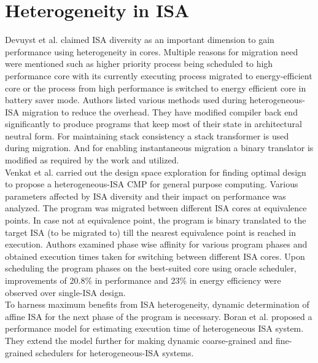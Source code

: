\documentclass[a4paper,12pt, final]{report}
\begin{document}
\section{Heterogeneity in ISA}
Devuyst et al. \cite{DeVuystVT12} claimed ISA diversity as an important dimension to gain performance using heterogeneity in cores. Multiple reasons for migration need were mentioned such as higher priority process being scheduled to high performance core with its currently executing process migrated to energy-efficient core or the process from high performance is switched to energy efficient core in battery saver mode. Authors listed various methods used during heterogeneous-ISA migration to reduce the overhead. They have modified compiler back end significantly to produce programs that keep most of their state in architectural neutral form. For maintaining stack consistency a stack transformer is used during migration. And for enabling instantaneous migration a binary translator is modified as required by the work and utilized. \\
\indent Venkat et al. \cite{venkat} carried out the design space exploration for finding optimal design to propose a heterogeneous-ISA CMP for general purpose computing.
Various parameters affected by ISA diversity and their impact on performance was analyzed. The program was migrated between different ISA cores at equivalence points. In case not at equivalence point, the program is binary translated to the target ISA (to be migrated to) till the nearest equivalence point is reached in execution. Authors examined phase wise affinity for various program phases and obtained execution times taken for switching between different ISA cores. Upon scheduling the program phases on the best-suited core using oracle scheduler, improvements of 20.8\% in performance and 23\% in energy efficiency were observed over single-ISA design. \\
\indent To harness maximum benefits from ISA heterogeneity, dynamic determination of affine ISA for the next phase of the program is necessary. Boran et al. \cite{perfcadsl} proposed a performance model for estimating execution time of heterogeneous ISA system. They extend the model further for making dynamic coarse-grained \cite{coarsecadsl} and fine-grained \cite{finecadsl} schedulers for heterogeneous-ISA systems.\\
\end{document}
